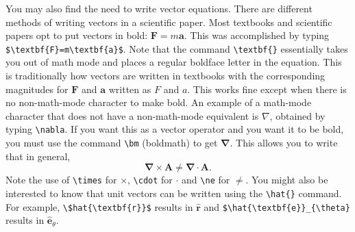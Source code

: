 \documentclass[preprint,pre,floats,aps,amsmath,amssymb]{revtex4}
\begin{document}
You may also find the need to write vector equations. There are different methods of writing vectors in a scientific paper. Most textbooks and scientific papers opt to put vectors in bold: $\textbf{F}=m\textbf{a}$. This was accomplished by typing \verb!$\textbf{F}=m\textbf{a}$!. Note that the command \verb!\textbf{}! essentially takes you out of math mode and places a regular boldface letter in the equation. This is traditionally how vectors are written in textbooks with the corresponding magnitudes for $\textbf{F}$ and $\textbf{a}$ written as $F$ and $a$. This works fine except when there is no non-math-mode character to make bold. An example of a math-mode character that does not have a non-math-mode equivalent is $\nabla$, obtained by typing \verb!\nabla!. If you want this as a vector operator and you want it to be bold, you must use the command \verb!\bm! (boldmath) to get $\bm{\nabla}$. This allows you
to write that in general,
\begin{equation}
\bm{\nabla}\times\textbf{A}\ne\bm{\nabla}\cdot\textbf{A}.
\end{equation}
Note the use of \verb!\times! for $\times$, \verb!\cdot! for $\cdot$ and \verb!\ne! for $\ne$. You might also be interested to know that unit vectors can be written using the \verb!\hat{}! command. For example, \verb!\$hat{\textbf{r}}$! results in $\hat{\textbf{r}}$ and \verb!$\hat{\textbf{e}}_{\theta}! results in
$\hat{\textbf{e}}_{\theta}$.
\end{document}
